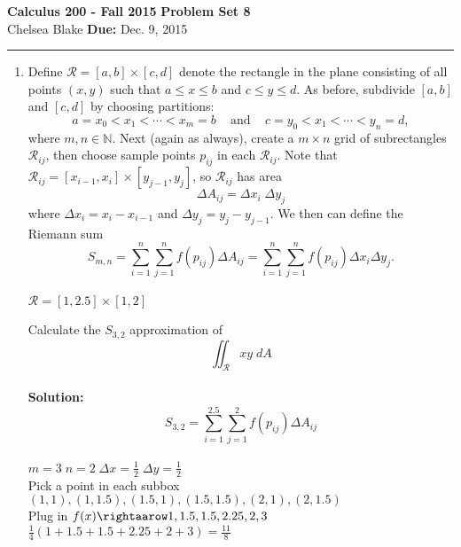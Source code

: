 \documentclass[11pt]{article}
\newcommand{\hwheadings}[3]{
{\bf Calculus 200 -  Fall 2015} \hfill {{\bf Problem Set #1}}\\
{{\bf } #2} \hfill {{\bf Due:} #3} \\
\rule[0.1in]{\textwidth}{0.025in}
}
\begin{document}
\hwheadings{8}{Chelsea Blake}{Dec. 9, 2015}


\begin{enumerate}


    
    
    
    \item Define $\mathcal{R} = [a,b] \times [c,d]$ denote the rectangle in the plane consisting of all points $(x,y)$ such that $a \le x \le b$ and $c \le y \le d$.  As before, subdivide $[a,b]$ and $[c,d]$ by choosing partitions:
    \[ a = x_0 < x_1 < \cdots < x_m = b \;\;\; \text{    and   } \;\;\;  c = y_0 < x_1 < \cdots < y_n = d,  \]
    where $m, n \in \mathbb{N}$.  Next (again as always), create a $m \times n$ grid of subrectangles $\mathcal{R}_{ij}$, then choose sample points $p_{ij}$ in each $\mathcal{R}_{ij}$.  Note that $\mathcal{R}_{ij} = [x_{i-1}, x_i] \times [y_{j-1},y_j]$, so $\mathcal{R}_{ij}$ has area 
    \[ \Delta A_{ij} = \Delta x_i  \;  \Delta y_j \] 
    where $\Delta x_i = x_i - x_{i-1}$ and $\Delta y_j = y_j - y_{j-1}$.  We then can define the Riemann sum 
    \[ S_{m,n} =  \sum_{i=1}^n \sum_{j=1}^n f(p_{ij}) \Delta A_{ij} = \sum_{i=1}^n \sum_{j=1}^n f(p_{ij}) \Delta x_{i} \Delta y_{j}.  \] 
    \\
    $\mathcal{R}=[1,2.5] \times [1,2]$
    
    Calculate the $ S_{3,2}$ approximation of 
    \[  \iint_{\mathcal{R}} xy \; dA  \]
    \\
    \textbf{Solution:} \\
     \[ S_{3,2} =  \sum_{i=1}^{2.5} \sum_{j=1}^2 f(p_{ij}) \Delta A_{ij}  \] 
     \\
     $m=3 \; n=2 \; \Delta x= \frac{1}{2} \; \Delta y= \frac{1}{2}$ \\
     Pick a point in each subbox $(1,1),(1,1.5),(1.5,1),(1.5,1.5),(2,1),(2,1.5)$ \\
     Plug in $f(x) \rightaarow 1,1.5,1.5,2.25,2,3$
     \\
     $\frac{1}{4}(1+1.5+1.5+2.25+2+3)= \frac{11}{8}$
    
    
    
    
    

\end{enumerate}
\end{document}
